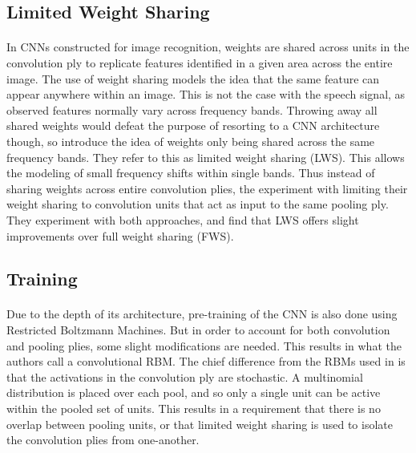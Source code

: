 \documentclass[letterpaper]{article}
\begin{document}
\subsection*{Limited Weight Sharing}

\paragraph{} In CNNs constructed for image recognition, weights are shared across units in the convolution ply to replicate features identified in a given area across the entire image. The use of weight sharing models the idea that the same feature can appear anywhere within an image. This is not the case with the speech signal, as observed features normally vary across frequency bands. Throwing away all shared weights would defeat the purpose of resorting to a CNN architecture though, so \cite{DBLP:journals/taslp/Abdel-HamidMJDPY14} introduce the idea of weights only being shared across the same frequency bands. They refer to this as limited weight sharing (LWS). This allows the modeling of small frequency shifts within single bands. Thus instead of sharing weights across entire convolution plies, the experiment with limiting their weight sharing to convolution units that act as input to the same pooling ply. They experiment with both approaches, and find that LWS offers slight improvements over full weight sharing (FWS).

\subsection*{Training}

\paragraph{} Due to the depth of its architecture, pre-training of the CNN is also done using Restricted Boltzmann Machines. But in order to account for both convolution and pooling plies, some slight modifications are needed. This results in what the authors call a convolutional RBM. The chief difference from the RBMs used in \cite{DBLP:journals/taslp/DahlYDA12} is that the activations in the convolution ply are stochastic. A multinomial distribution is placed over each pool, and so only a single unit can be active within the pooled set of units. This results in a requirement that there is no overlap between pooling units, or that limited weight sharing is used to isolate the convolution plies from one-another.
\end{document}

